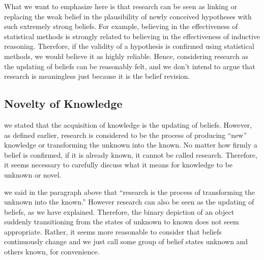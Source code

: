 \documentclass{book}
\begin{document}

What we want to emphasize here is that research can be seen as linking or replacing the weak belief in the plausibility of newly conceived hypotheses with such extremely strong beliefs. For example, believing in the effectiveness of statistical methods is strongly related to believing in the effectiveness of inductive reasoning. Therefore, if the validity of a hypothesis is confirmed using statistical methods, we would believe it as highly reliable. Hence, considering research as the updating of beliefs can be reasonably felt, and we don't intend to argue that research is meaningless just because it is the belief revision. 

\subsection{Novelty of Knowledge}
we stated that the acquisition of knowledge is the updating of beliefs. However, as defined earlier, research is considered to be the process of producing ``new'' knowledge or transforming the unknown into the known. No matter how firmly a belief is confirmed, if it is already known, it cannot be called research. Therefore, it seems necessary to carefully discuss what it means for knowledge to be unknown or novel.

we said in the paragraph above that ``research is the process of transforming the unknown into the known.'' However research can also be seen as the updating of beliefs, as we have explained. Therefore, the binary depiction of an object suddenly transitioning from the states of unknown to known does not seem appropriate. Rather, it seems more reasonable to consider that beliefs continuously change and we just call some group of belief states unknown and others known, for convenience.
\end{document}
